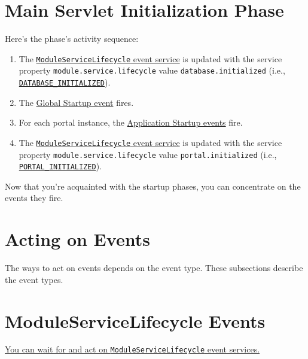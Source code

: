 \section{Main Servlet Initialization
Phase}\label{main-servlet-initialization-phase}

Here's the phase's activity sequence:

\begin{enumerate}
\def\labelenumi{\arabic{enumi}.}
\item
  The
  \hyperref[moduleservicelifecycle-events]{\texttt{ModuleServiceLifecycle}
  event service} is updated with the service property
  \texttt{module.service.lifecycle} value \texttt{database.initialized}
  (i.e.,
  \href{https://docs.liferay.com/dxp/portal/7.2-latest/javadocs/portal-kernel/constant-values.html\#com.liferay.portal.kernel.module.framework.ModuleServiceLifecycle.DATABASE_INITIALIZED}{\texttt{DATABASE\_INITIALIZED}}).
\item
  The \hyperref[portal-startup-events]{Global Startup event} fires.
\item
  For each portal instance, the
  \hyperref[portal-startup-events]{Application Startup events} fire.
\item
  The
  \hyperref[moduleservicelifecycle-events]{\texttt{ModuleServiceLifecycle}
  event service} is updated with the service property
  \texttt{module.service.lifecycle} value \texttt{portal.initialized}
  (i.e.,
  \href{https://docs.liferay.com/dxp/portal/7.2-latest/javadocs/portal-kernel/constant-values.html\#com.liferay.portal.kernel.module.framework.ModuleServiceLifecycle.PORTAL_INITIALIZED}{\texttt{PORTAL\_INITIALIZED}}).
\end{enumerate}

Now that you're acquainted with the startup phases, you can concentrate
on the events they fire.

\section{Acting on Events}\label{acting-on-events}

The ways to act on events depends on the event type. These subsections
describe the event types.

\section{ModuleServiceLifecycle
Events}\label{moduleservicelifecycle-events}

\href{/docs/7-2/customization/-/knowledge_base/c/waiting-on-lifecycle-events}{You
can wait for and act on \texttt{ModuleServiceLifecycle} event services.}

